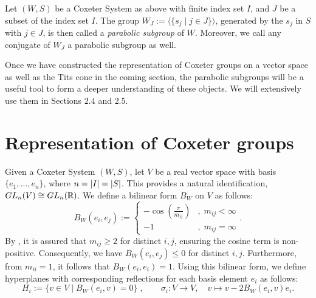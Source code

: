 \begin{definition}
    Let \((W,S)\) be a Coxeter System as above with finite index set \(I\), and \(J\) be a subset of the index set \(I\).
    The group \(W_J := \langle\{s_j \;\vert\; j\in J\}\rangle\), generated by the \(s_j\) in \(S\) with \(j \in J\), is then called a \emph{parabolic subgroup} of \(W\).
    Moreover, we call any conjugate of \(W_J\) a parabolic subgroup as well.
\end{definition}

Once we have constructed the representation of Coxeter groups on a vector space as well as the Tits cone in the coming section, the parabolic subgroups will be a useful tool to form a deeper understanding of these objects.
We will extensively use them in Sections \(2.4\) and \(2.5\).

\section{Representation of Coxeter groups}

Given a Coxeter System \((W,S)\), let \(V\) be a real vector space with basis \(\{e_1,\ldots,e_n\}\), where \(n=\left\vert I\right\vert=\left\vert S\right\vert\).
This provides a natural identification, \(GL_n(V)\cong GL_n(\mathbb{R})\).
We define a bilinear form \(B_W\) on \(V\) as follows:
\begin{equation*}
    B_W(e_i, e_j) := \begin{cases}
        -\cos \left(\frac{\pi}{m_{ij}}\right) & ,\; m_{ij}<\infty \\
        -1                                    & ,\; m_{ij}=\infty
    \end{cases}.
\end{equation*}
By , it is assured that \(m_{ij}\geq 2\) for distinct \(i,j\), ensuring the cosine term is non-positive.
Consequently, we have \(B_W(e_i,e_j)\leq 0\) for distinct \(i,j\).
Furthermore, from \(m_{ii}=1\), it follows that \(B_W(e_i,e_i)=1\).
Using this bilinear form, we define hyperplanes with corresponding reflections for each basis element \(e_i\) as follows:
\[H_i := \{v\in V\;\vert\; B_W(e_i,v) = 0\}\;, \qquad \sigma_i : V\to V,\quad v\mapsto v - 2B_W(e_i,v)e_i.\]

